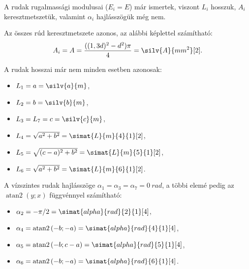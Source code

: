 \documentclass[a4paper, 12pt]{scrartcl}
\DeclareMathOperator\atann{atan2}
\begin{document}
A rudak rugalmassági modulusai ($E_i = E$) már ismertek, viszont $L_i$ hosszuk,
$A_i$ keresztmetszetük, valamint $\alpha_i$ hajlásszögük még nem.

Az összes rúd keresztmetszete azonos, az alábbi képlettel számítható:
\begin{equation}
  A_i = A = \frac{((1,3d)^2 - d^2)\pi}{4} = \silv{A}{mm^2}[2].
  \label{eq:A}
\end{equation}

A rudak hosszai már nem minden esetben azonosak:

\begin{minipage}[c]{.26\linewidth}
  \begin{itemize}
    \item $L_1 = a = \silv{a}{m}$,
    \item $L_2 = b = \silv{b}{m}$,
  \end{itemize}
\end{minipage}%
\begin{minipage}[c]{.33\linewidth}
  \begin{itemize}
    \item $L_3 = L_7 = c = \silv{c}{m}$,
    \item $L_4 = \sqrt{a^2 + b^2} = \simat{L}{m}{4}{1}[2]$,
  \end{itemize}
\end{minipage}%
\begin{minipage}[c]{.38\linewidth}
  \begin{itemize}
    \item $L_5 = \sqrt{(c - a)^2 + b^2} = \simat{L}{m}{5}{1}[2]$,
    \item $L_6 = \sqrt{a^2 + b^2} = \simat{L}{m}{6}{1}[2]$.
  \end{itemize}
\end{minipage}

A vízszintes rudak hajlásszöge $\alpha_1 = \alpha_3 = \alpha_7 = \SI{0}{rad}$,
a többi elemé pedig az $\atann(y; x)$ függvénnyel számítható:
\begin{multicols}{2}
  \begin{itemize}
    \item $\a_2 = -\pi/2 = \simat{alpha}{rad}{2}{1}[4]$,
    \item $\a_4 = \atann \left( -b; -a \right) = \simat{alpha}{rad}{4}{1}[4]$,
    \item $\a_5 = \atann \left( -b; c-a \right) = \simat{alpha}{rad}{5}{1}[4]$,
    \item $\a_6 = \atann \left( -b; -a \right) = \simat{alpha}{rad}{6}{1}[4]$.
  \end{itemize}
\end{multicols}
\end{document}
